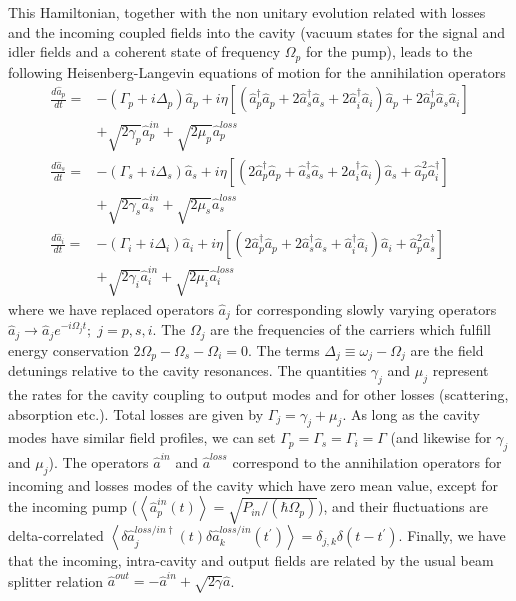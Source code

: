 \documentclass[aps,prl,twocolumn,groupedaddress]{revtex4-1}
\begin{document}
This Hamiltonian, together with the non unitary evolution related with losses and the incoming coupled fields into the cavity (vacuum states for the signal and idler fields and a coherent state of frequency $\Omega_p$ for the pump), leads to the following Heisenberg-Langevin equations of motion for the annihilation operators 
{\small \begin{align}
	\frac{d \hat{a}_p}{dt}=&-\left(\Gamma_p+i \Delta_p\right)\hat{a}_p+i\eta\left[\left(\hat{a}_p^{\dagger}\hat{a}_p+2\hat{a}_s^{\dagger}\hat{a}_s+2\hat{a}_i^{\dagger}\hat{a}_i\right)\hat{a}_p+2\hat{a}_p^{\dagger}\hat{a}_s\hat{a}_i\right]\nonumber\\&+\sqrt{2\gamma_p}\hat{a}_p^{in}+\sqrt{2\mu_p}\hat{a}_p^{loss} \nonumber\\ 
	\frac{d \hat{a}_s}{dt}=&-\left(\Gamma_s+i \Delta_s\right)\hat{a}_s+i\eta\left[\left(2\hat{a}_p^{\dagger}\hat{a}_p+\hat{a}_s^{\dagger}\hat{a}_s+2\hat{a}_i^{\dagger}\hat{a}_i\right)\hat{a}_s+\hat{a}_p^{2}\hat{a}_i^{\dagger}\right]\nonumber\\&+\sqrt{2\gamma_s}\hat{a}_s^{in} +\sqrt{2\mu_s}\hat{a}_s^{loss}\nonumber\\ 
	\frac{d \hat{a}_i}{dt}=&-\left(\Gamma_i+i \Delta_i\right)\hat{a}_i+i\eta\left[\left(2\hat{a}_p^{\dagger}\hat{a}_p+2\hat{a}_s^{\dagger}\hat{a}_s+\hat{a}_i^{\dagger}\hat{a}_i\right)\hat{a}_i+\hat{a}_p^{2}\hat{a}_s^\dagger\right]\nonumber\\&+\sqrt{2\gamma_i}\hat{a}_i^{in} +\sqrt{2\mu_i}\hat{a}_i^{loss} \label{eqn:chi3EqnMovModes}
	\end{align}
} where we have replaced operators $\hat{a}_j$ for corresponding slowly varying operators $\hat{a}_j\rightarrow\hat{a}_j e^{-i \Omega_j t}; \; j={p,s,i}$. The $\Omega_j$ are the frequencies of the carriers which fulfill energy conservation $2\Omega_p-\Omega_s-\Omega_i=0$. The terms $\Delta_j\equiv\omega_j-\Omega_j$ are the field detunings relative to the cavity resonances. The quantities $\gamma_j$ and $\mu_j$ represent the rates for the cavity coupling to output modes and for other losses (scattering, absorption etc.). Total losses are given by $\Gamma_j=\gamma_j+\mu_j$. As long as the cavity modes have similar field profiles, we can set $\Gamma_p=\Gamma_s=\Gamma_i=\Gamma$ (and likewise for $\gamma_j$ and $\mu_j$).  The operators $\hat{a}^{in}$ and $\hat{a}^{loss}$ correspond to the annihilation operators for incoming and losses modes of the cavity which have zero mean value, except for the incoming pump ($\left<\hat{a}_p^{in}(t)\right>=\!\!\sqrt{P_{in}/(\hbar\Omega_p)}$), and their fluctuations are delta-correlated $\left<\delta\hat{a}_j^{loss/in \dagger}(t)\delta\hat{a}_k^{loss/in}(t^\prime)\right>\!=\!\delta_{j,k}\delta(t-t^\prime)$. Finally, we have that the incoming, intra-cavity and output fields are related by the usual beam splitter relation $\hat{a}^{out}=-\hat{a}^{in}+\sqrt{2\gamma}\hat{a}$.
\end{document}
